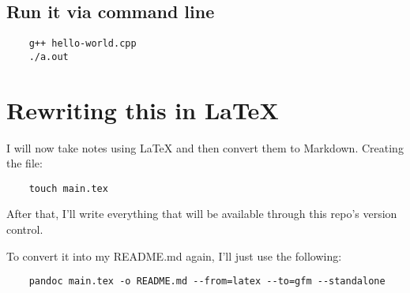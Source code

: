 \documentclass{article}
\begin{document}
\subsection{Run it via command line}
\begin{verbatim}
    g++ hello-world.cpp
    ./a.out 
\end{verbatim}

\section{Rewriting this in \LaTeX}
I will now take notes using \LaTeX{} and then convert them to Markdown. Creating the file:

\begin{verbatim}
    touch main.tex
\end{verbatim}

After that, I'll write everything that will be available through this repo's version control.

To convert it into my README.md again, I'll just use the following:
\begin{verbatim}
    pandoc main.tex -o README.md --from=latex --to=gfm --standalone
\end{verbatim}



\end{document}
